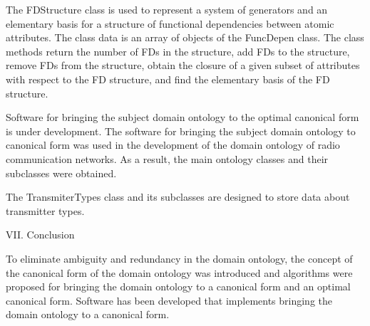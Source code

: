 \documentclass{scndocument}
\begin{document}
{The FDStructure class is used to represent a system of generators and an elementary basis for a structure of functional dependencies between atomic attributes. The class data is an array of objects of the FuncDepen class. The class methods return the number of FDs in the structure, add FDs to the structure, remove FDs from the structure, obtain the closure of a given subset of attributes with respect to the FD structure, and find the elementary basis of the FD structure}.

{Software for bringing the subject domain ontology to the optimal canonical form is under development. The software for bringing the subject domain ontology to canonical form was used in the development of the domain ontology of radio communication networks. As a result, the main ontology classes and their subclasses were obtained.}

{The TransmiterTypes class and its subclasses are designed to store data about transmitter types.}

\begin{center}
{VII. Conclusion}
\end{center}

{To eliminate ambiguity and redundancy in the domain ontology, the concept of the canonical form of the domain ontology
was introduced and algorithms were proposed for bringing the
domain ontology to a canonical form and an optimal canonical
form. Software has been developed that implements bringing
the domain ontology to a canonical form.} 
\end{document}
